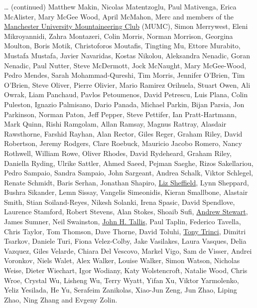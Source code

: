 \documentclass[
]{book}
\begin{document}
\ldots{} (continued) Matthew Makin, Nicolas Matentzoglu, Paul Mativenga, Erica McAlister, Mary McGee Wood, April McMahon, Merc and members of the \href{https://www.mumc.me.uk/wordpress}{Manchester University Mountaineering Club} (MUMC), Simon Merrywest, Eleni Mikroyannidi, Zahra Montazeri, Colin Morris, Norman Morrison, Georgina Moulton, Boris Motik, Christoforos Moutafis, Tingting Mu, Ettore Murabito, Mustafa Mustafa, Javier Navaridas, Kostas Nikolou, Aleksandra Nenadic, Goran Nenadic, Paul Nutter, Steve McDermott, Jock McNaught, Mary McGee-Wood, Pedro Mendes, Sarah Mohammad-Qureshi, Tim Morris, Jennifer O'Brien, Tim O'Brien, Steve Oliver, Pierre Olivier, Mario Ramirez Orihuela, Stuart Owen, Ali Owrak, Liam Panchaud, Pavlos Petoumenos, David Petrescu, Luis Plana, Colin Puleston, Ignazio Palmisano, Dario Panada, Michael Parkin, Bijan Parsia, Jon Parkinson, Norman Paton, Jeff Pepper, Steve Pettifer, Ian Pratt-Hartmann, Mark Quinn, Rishi Ramgolam, Allan Ramsay, Magnus Rattray, Alasdair Rawsthorne, Farshid Rayhan, Alan Rector, Giles Reger, Graham Riley, David Robertson, Jeremy Rodgers, Clare Roebuck, Mauricio Jacobo Romero, Nancy Rothwell, William Rowe, Oliver Rhodes, David Rydeheard, Graham Riley, Daniella Ryding, Ulrike Sattler, Ahmed Saeed, Pejman Saeghe, Rizos Sakellariou, Pedro Sampaio, Sandra Sampaio, John Sargeant, Andrea Schalk, Viktor Schlegel, Renate Schmidt, Baris Serhan, Jonathan Shapiro, \href{https://www.manchester.ac.uk/discover/governance/structure/board-governors/members/liz-sheffield/}{Liz Sheffield}, Lynn Sheppard, Bushra Sikander, Lemn Sissay, Vangelis Simeonidis, Kieran Smallbone, Alastair Smith, Stian Soiland-Reyes, Nikesh Solanki, Irena Spasic, David Spendlove, Laurence Stamford, Robert Stevens, Alan Stokes, Shoaib Sufi, \href{https://github.com/ajstewartlang}{Andrew Stewart}, James Sumner, Neil Swainston, \href{https://doi.org/10.1002/jqs.3390060408}{John H. Tallis}, Paul Taplin, Federico Tavella, Chris Taylor, Tom Thomson, Dave Thorne, David Toluhi, \href{https://www.theguardian.com/science/2020/nov/10/tony-trinci-obituary}{Tony Trinci}, Dimitri Tsarkov, Daniele Turi, Fiona Velez-Colby, Jake Vasilakes, Laura Vasques, Delia Vazquez, Giles Velarde, Chiara Del Vescovo, Markel Vigo, Sam de Visser, Andrei Voronkov, Niels Walet, Alex Walker, Louise Walker, Simon Watson, Nicholas Weise, Dieter Wiechart, Igor Wodiany, Katy Wolstencroft, Natalie Wood, Chris Wroe, Crystal Wu, Lisheng Wu, Terry Wyatt, Yifan Xu, Viktor Yarmolenko, Yeliz Yesilada, He Yu, Serafeim Zanikolas, Xiao-Jun Zeng, Jun Zhao, Liping Zhao, Ning Zhang and Evgeny Zolin.
\end{document}
